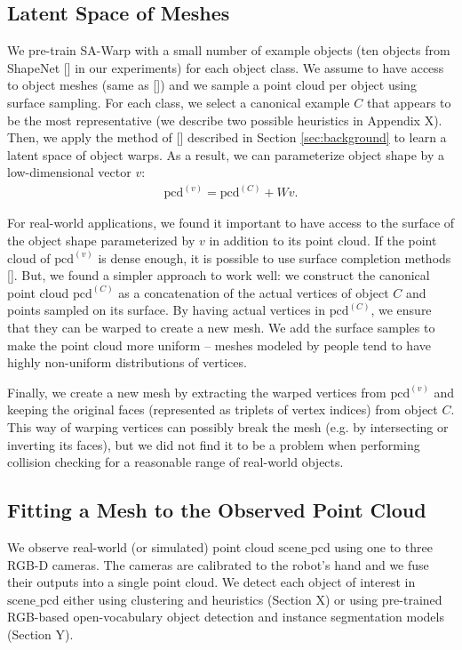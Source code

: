 \documentclass{article}
\newcommand{\pcx}[1]{\mathrm{pcd}^{(#1)}}
\newcommand{\pcc}{\pcx{C}}
\begin{document}
\subsection{Latent Space of Meshes}
\label{sec:methods:mesh}

We pre-train SA-Warp with a small number of example objects (ten objects from ShapeNet [] in our experiments) for each object class. We assume to have access to object meshes (same as []) and we sample a point cloud per object using surface sampling. For each class, we select a canonical example $C$ that appears to be the most representative (we describe two possible heuristics in Appendix X). Then, we apply the method of [] described in Section \ref{sec:background} to learn a latent space of object warps. As a result, we can parameterize object shape by a low-dimensional vector $v$:
\begin{align}
    \pcx{v} = \pcc + W v. \tag{3}
\end{align}

For real-world applications, we found it important to have access to the surface of the object shape parameterized by $v$ in addition to its point cloud. If the point cloud of $\pcx{v}$ is dense enough, it is possible to use surface completion methods []. But, we found a simpler approach to work well: we construct the canonical point cloud $\pcc$ as a concatenation of the actual vertices of object $C$ and points sampled on its surface. By having actual vertices in $\pcc$, we ensure that they can be warped to create a new mesh. We add the surface samples to make the point cloud more uniform -- meshes modeled by people tend to have highly non-uniform distributions of vertices.

Finally, we create a new mesh by extracting the warped vertices from $\pcx{v}$ and keeping the original faces (represented as triplets of vertex indices) from object $C$. This way of warping vertices can possibly break the mesh (e.g. by intersecting or inverting its faces), but we did not find it to be a problem when performing collision checking for a reasonable range of real-world objects.

\subsection{Fitting a Mesh to the Observed Point Cloud}
\label{sec:methods:scene}

We observe real-world (or simulated) point cloud $\mathrm{scene\_pcd}$ using one to three RGB-D cameras. The cameras are calibrated to the robot's hand and we fuse their outputs into a single point cloud. We detect each object of interest in $\mathrm{scene\_pcd}$ either using clustering and heuristics (Section X) or using pre-trained RGB-based open-vocabulary object detection and instance segmentation models (Section Y).
\end{document}
